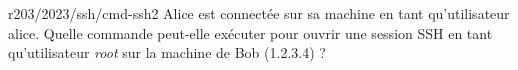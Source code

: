 \begin{question}{r203/2023/ssh/cmd-ssh2}
  Alice est connectée sur sa machine en tant qu'utilisateur
  alice. Quelle commande peut-elle exécuter pour ouvrir une session
  SSH en tant qu'utilisateur {\em root} sur la machine de Bob
  (1.2.3.4) ?
  \begin{reponses}[2]
    \lastchoices
  \end{reponses}
\end{question}
